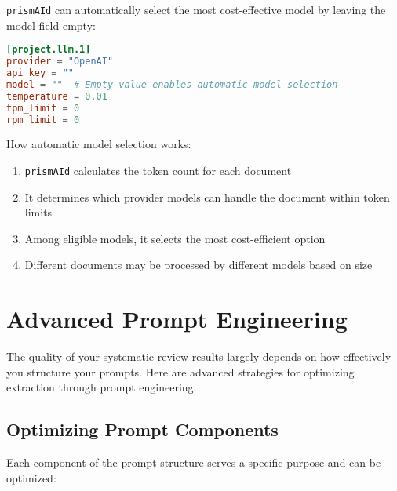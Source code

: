 \texttt{prismAId} can automatically select the most cost-effective model by leaving the model field empty:

\begin{configbox}
\begin{lstlisting}[language=TOML]
[project.llm.1]
provider = "OpenAI"
api_key = ""
model = ""  # Empty value enables automatic model selection
temperature = 0.01
tpm_limit = 0
rpm_limit = 0
\end{lstlisting}
\end{configbox}

How automatic model selection works:
\begin{enumerate}
    \item \texttt{prismAId} calculates the token count for each document
    \item It determines which provider models can handle the document within token limits
    \item Among eligible models, it selects the most cost-efficient option
    \item Different documents may be processed by different models based on size
\end{enumerate}

\section{Advanced Prompt Engineering}

The quality of your systematic review results largely depends on how effectively you structure your prompts. Here are advanced strategies for optimizing extraction through prompt engineering.

\subsection{Optimizing Prompt Components}

Each component of the prompt structure serves a specific purpose and can be optimized:

